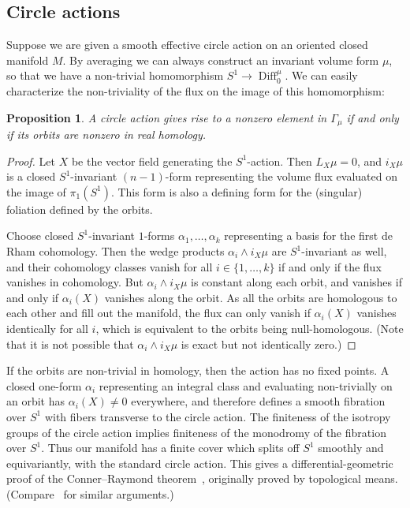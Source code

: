 \documentclass[12pt]{amsart}
\newtheorem{proposition}[theorem]{Proposition}
\theoremstyle{definition}
\theoremstyle{remark}
\newcommand\Diff{\operatorname{Diff}}
\begin{document}
\subsection{Circle actions}
Suppose we are given a smooth effective circle action on an oriented closed manifold 
$M$. By averaging we can always construct an invariant volume form 
$\mu$, so that we have a non-trivial homomorphism $S^{1}\rightarrow 
\Diff^{\mu}_{0}$. We can easily characterize the non-triviality of the 
flux on the image of this homomorphism:
\begin{proposition}\label{p:circle}
    A circle action gives rise to a nonzero element in $\Gamma_{\mu}$ 
    if and only if its orbits are nonzero in real homology.
    \end{proposition}
    \begin{proof}
	Let $X$ be the vector field generating the $S^{1}$-action. Then 
$L_{X}\mu = 0$, and $i_{X}\mu$ is a closed $S^{1}$-invariant $(n-1)$-form 
representing the volume flux evaluated on the image of $\pi_{1}(S^{1})$. 
This form is also a defining form for the (singular) foliation defined by 
the orbits. 

Choose closed $S^{1}$-invariant $1$-forms $\alpha_{1},\ldots,\alpha_{k}$ 
representing a basis for the first de Rham cohomology. Then the wedge 
products $\alpha_{i}\wedge i_{X}\mu$ are $S^{1}$-invariant as well, 
and their cohomology classes vanish for all $i\in\{1,\ldots,k\}$ if 
and only if the flux vanishes in cohomology. But $\alpha_{i}\wedge 
i_{X}\mu$ is constant along each orbit, and vanishes if and only if 
$\alpha_{i}(X)$ vanishes along the orbit. As all the orbits are homologous 
to each other and fill out the manifold, the flux can only vanish if 
$\alpha_{i}(X)$ vanishes identically for all $i$, which is equivalent to 
the orbits being null-homologous.
	(Note that it is not possible that $\alpha_{i}\wedge i_{X}\mu$ is 
	exact but not identically zero.)
	\end{proof}
	
If the orbits are non-trivial in homology, then the action has no fixed points. 
A closed one-form $\alpha_{i}$ representing an integral class and evaluating 
non-trivially on an orbit has $\alpha_{i}(X)\neq 0$ everywhere, and therefore 
defines a smooth fibration over $S^{1}$ with fibers transverse to the circle action.
The finiteness of the isotropy groups of the circle action implies finiteness of the 
monodromy of the fibration over $S^{1}$. Thus our manifold has a finite cover 
which splits off $S^{1}$ smoothly and equivariantly, with the standard circle action. 
This gives a differential-geometric proof of the Conner--Raymond 
theorem~\cite{CR}, originally proved by topological means.
(Compare~\cite{FM} for similar arguments.)
\end{document}

